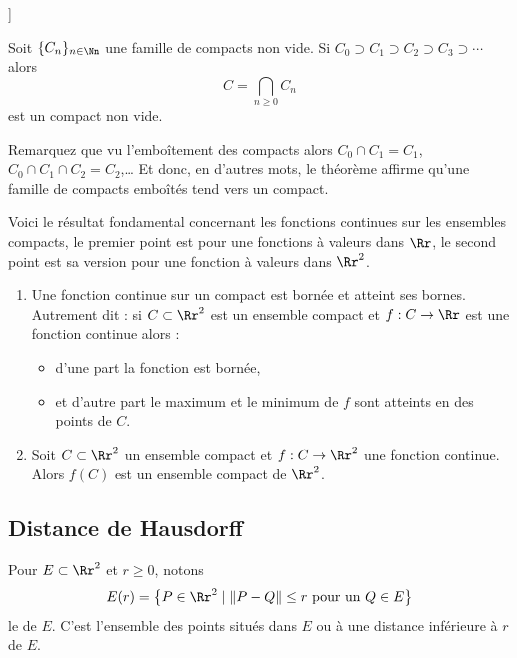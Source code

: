 \documentclass[11pt,class=report,crop=false]{standalone}
\newcommand{\commentfigure}[1]{#1} %
\begin{document}
\bigskip
[[dessin à faire de compacts emboités]]
\bigskip

\begin{theoreme}
Soit $\{ C_n\}_{n\in \Nn}$ une famille de compacts non vide.
Si $C_0 \supset C_1 \supset C_2 \supset C_3 \supset \cdots$ alors 
$$C = \bigcap_{n\ge0} C_n$$
est un compact non vide.
\end{theoreme}



Remarquez que vu l’emboîtement des compacts alors
$C_0\cap C_1=C_1$, $C_0\cap C_1\cap C_2=C_2$,\ldots
Et donc, en d'autres mots, le théorème affirme qu'une famille de compacts emboîtés
tend vers un compact.

\bigskip

Voici le résultat fondamental concernant les fonctions continues sur les ensembles compacts, le premier
point est pour une fonctions à valeurs dans $\Rr$, le second point est sa version pour une fonction à valeurs dans $\Rr^2$.
\begin{theoreme}
\sauteligne
\begin{enumerate}
  \item Une fonction continue sur un compact est bornée et atteint ses bornes.
Autrement dit : si $C \subset \Rr^2$ est un ensemble compact et  $f : C  \to \Rr$ est une fonction continue
alors :
  \begin{itemize}
    \item d'une part la fonction est bornée, 
    \item et d'autre part le maximum et le minimum de $f$ sont atteints en des points de $C$.
  \end{itemize}
 
  \item Soit $C \subset \Rr^2$ un ensemble compact et  $f : C  \to \Rr^2$ une fonction continue.
Alors $f(C)$ est un ensemble compact de $\Rr^2$.
\end{enumerate}
\end{theoreme}


\subsection{Distance de Hausdorff}
\label{ssec:haus}

Pour $E \subset \Rr^2$ et $r \ge 0$, notons 
$$E(r) = \big\{ P \in \Rr^2 \mid \| P - Q \| \le r \text{ pour un } Q \in E \big\}$$
le  de $E$.
C'est l'ensemble des points situés dans $E$ ou à une distance inférieure à $r$ de $E$.
\end{document}
